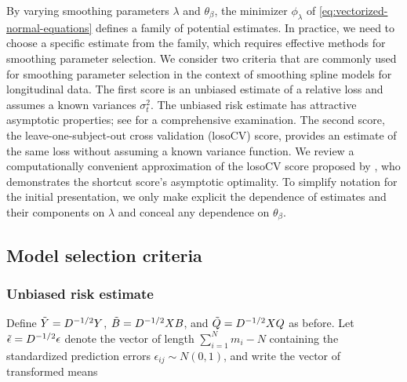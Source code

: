 
\bigskip

By varying smoothing parameters $\lambda$ and $\theta_\beta$, the minimizer $\phi_\lambda$ of \ref{eq:vectorized-normal-equations} defines a family of potential estimates. In practice, we need to choose a specific estimate from the family, which requires effective methods for smoothing parameter selection. We consider two criteria that are commonly used for smoothing parameter selection in the context of smoothing spline models for longitudinal data. The first score is an unbiased estimate of a relative loss and assumes a known variances $\sigma_t^2$. The unbiased risk estimate has attractive asymptotic properties; see \citet{gu2013smoothing} for a comprehensive examination. The second score, the leave-one-subject-out cross validation (losoCV) score, provides an estimate of the same loss without assuming a known variance function. We review a computationally convenient approximation of the losoCV score proposed by \citet{xu2012asymptotic}, who demonstrates the shortcut score's asymptotic optimality. To simplify notation for the initial presentation, we only make explicit the dependence of estimates and their components on $\lambda$ and conceal any dependence on $\theta_\beta$. 

\subsection{Model selection criteria}
\subsubsection{Unbiased risk estimate}

Define  $\tilde{Y} = D^{-1/2} Y$, $\tilde{B} = D^{-1/2} X B $, and $\tilde{Q} = D^{-1/2} X Q$ as before. Let $\tilde{\epsilon} = D^{-1/2} \epsilon$ denote the vector of length  $\sum_{i = 1}^Nm_i - N$ containing the standardized prediction errors $\epsilon_{ij} \sim N\left(0,1\right)$, and write the vector of transformed means 

